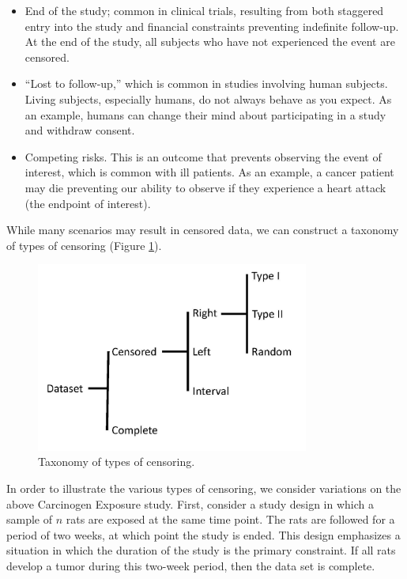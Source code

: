 \documentclass[
]{book}
\providecommand{\tightlist}{%
  \setlength{\itemsep}{0pt}\setlength{\parskip}{0pt}}
\theoremstyle{plain}
\theoremstyle{mydefn}
\theoremstyle{myexmpl}
\theoremstyle{remark}
\begin{document}
\begin{itemize}
\tightlist
\item
  End of the study; common in clinical trials, resulting from both staggered entry into the study and financial constraints preventing indefinite follow-up. At the end of the study, all subjects who have not experienced the event are censored.
\item
  ``Lost to follow-up,'' which is common in studies involving human subjects. Living subjects, especially humans, do not always behave as you expect. As an example, humans can change their mind about participating in a study and withdraw consent.
\item
  Competing risks. This is an outcome that prevents observing the event of interest, which is common with ill patients. As an example, a cancer patient may die preventing our ability to observe if they experience a heart attack (the endpoint of interest).
\end{itemize}

While many scenarios may result in censored data, we can construct a taxonomy of types of censoring (Figure \ref{fig:surv-taxonomy}).

\begin{figure}

{\centering \includegraphics[width=0.8\textwidth]{images/censoring-taxonomy} 

}

\caption{Taxonomy of types of censoring.}\label{fig:surv-taxonomy}
\end{figure}

In order to illustrate the various types of censoring, we consider variations on the above Carcinogen Exposure study. First, consider a study design in which a sample of \(n\) rats are exposed at the same time point. The rats are followed for a period of two weeks, at which point the study is ended. This design emphasizes a situation in which the duration of the study is the primary constraint. If all rats develop a tumor during this two-week period, then the data set is complete.
\end{document}
